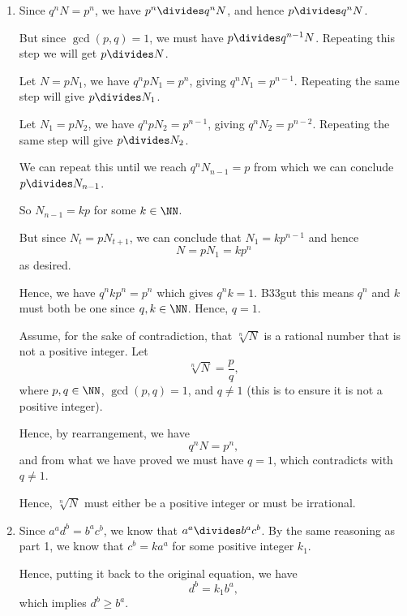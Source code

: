 \Question{\currfilebase}

\begin{enumerate}
    \item Since \(q^n N = p^n\), we have \(p^n \divides q^n N\), and hence \(p \divides q^n N\).

          But since \(\gcd(p, q) = 1\), we must have \(p \divides q^{n - 1} N\). Repeating this step we will get \(p \divides N\).

          Let \(N = p N_1\), we have \(q^n p N_1 = p^n\), giving \(q^n N_1 = p^{n - 1}\). Repeating the same step will give \(p \divides N_1\).

          Let \(N_1 = p N_2\), we have \(q^n p N_2 = p^{n - 1}\), giving \(q^n N_2 = p^{n - 2}\). Repeating the same step will give \(p \divides N_2\).

          We can repeat this until we reach \(q^n N_{n - 1} = p\) from which we can conclude \(p \divides N_{n - 1}\).

          So \(N_{n - 1} = kp\) for some \(k \in \NN\).

          But since \(N_t = p N_{t + 1}\), we can conclude that \(N_1 = k p^{n - 1}\) and hence
          \[
              N = p N_1 = k p^n
          \]
          as desired.

          Hence, we have \(q^n k p^n = p^n\) which gives \(q^n k = 1\). B33gut this means \(q^n\) and \(k\) must both be one since \(q, k \in \NN\). Hence, \(q = 1\).

          Assume, for the sake of contradiction, that \(\sqrt[n]{N}\) is a rational number that is not a positive integer. Let
          \[
              \sqrt[n]{N} = \frac{p}{q},
          \]
          where \(p, q \in \NN\), \(\gcd(p, q) = 1\), and \(q \neq 1\) (this is to ensure it is not a positive integer).

          Hence, by rearrangement, we have
          \[
              q^n N = p^n,
          \]
          and from what we have proved we must have \(q = 1\), which contradicts with \(q \neq 1\).

          Hence, \(\sqrt[n]{N}\) must either be a positive integer or must be irrational.

    \item Since \(a^a d^b = b^a c^b\), we know that \(a^a \divides b^a c^b\). By the same reasoning as part 1, we know that \(c^b = k a^a\) for some positive integer \(k_1\).

          Hence, putting it back to the original equation, we have
          \[
              d^b = k_1 b^a,
          \]
          which implies \(d^b \geq b^a\).


\end{enumerate}
